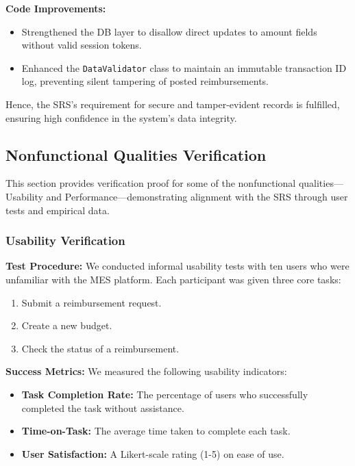 \documentclass[12pt, titlepage]{article}
\begin{document}
\noindent
\textbf{Code Improvements:}  
\begin{itemize}
  \item Strengthened the DB layer to disallow direct updates to amount fields without valid session tokens.
  \item Enhanced the \texttt{DataValidator} class to maintain an immutable transaction ID log, preventing silent tampering of posted reimbursements.
\end{itemize}
Hence, the SRS’s requirement for secure and tamper-evident records is fulfilled, ensuring high confidence in the system’s data integrity.
	
\subsection{Nonfunctional Qualities Verification}
\label{sec:NonfunctionalQualitiesVerification}

This section provides verification proof for some of the nonfunctional qualities—Usability and Performance—demonstrating alignment with the SRS through user tests and empirical data.

\subsubsection{Usability Verification}
\label{sec:usability-proof}

\textbf{Test Procedure:}  
We conducted informal usability tests with ten users who were unfamiliar with the MES platform. Each participant was given three core tasks:
\begin{enumerate}
    \item Submit a reimbursement request.
    \item Create a new budget.
    \item Check the status of a reimbursement.
\end{enumerate}

\textbf{Success Metrics:}  
We measured the following usability indicators:
\begin{itemize}
    \item \textbf{Task Completion Rate:} The percentage of users who successfully completed the task without assistance.
    \item \textbf{Time-on-Task:} The average time taken to complete each task.
    \item \textbf{User Satisfaction:} A Likert-scale rating (1-5) on ease of use.
\end{itemize}
\end{document}
